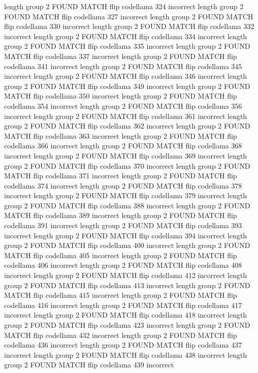 length group  2
FOUND MATCH flip codellama 324 incorrect
length group  2
FOUND MATCH flip codellama 327 incorrect
length group  2
FOUND MATCH flip codellama 330 incorrect
length group  2
FOUND MATCH flip codellama 332 incorrect
length group  2
FOUND MATCH flip codellama 334 incorrect
length group  2
FOUND MATCH flip codellama 335 incorrect
length group  2
FOUND MATCH flip codellama 337 incorrect
length group  2
FOUND MATCH flip codellama 341 incorrect
length group  2
FOUND MATCH flip codellama 345 incorrect
length group  2
FOUND MATCH flip codellama 346 incorrect
length group  2
FOUND MATCH flip codellama 349 incorrect
length group  2
FOUND MATCH flip codellama 350 incorrect
length group  2
FOUND MATCH flip codellama 354 incorrect
length group  2
FOUND MATCH flip codellama 356 incorrect
length group  2
FOUND MATCH flip codellama 361 incorrect
length group  2
FOUND MATCH flip codellama 362 incorrect
length group  2
FOUND MATCH flip codellama 363 incorrect
length group  2
FOUND MATCH flip codellama 366 incorrect
length group  2
FOUND MATCH flip codellama 368 incorrect
length group  2
FOUND MATCH flip codellama 369 incorrect
length group  2
FOUND MATCH flip codellama 370 incorrect
length group  2
FOUND MATCH flip codellama 371 incorrect
length group  2
FOUND MATCH flip codellama 374 incorrect
length group  2
FOUND MATCH flip codellama 378 incorrect
length group  2
FOUND MATCH flip codellama 379 incorrect
length group  2
FOUND MATCH flip codellama 388 incorrect
length group  2
FOUND MATCH flip codellama 389 incorrect
length group  2
FOUND MATCH flip codellama 391 incorrect
length group  2
FOUND MATCH flip codellama 393 incorrect
length group  2
FOUND MATCH flip codellama 394 incorrect
length group  2
FOUND MATCH flip codellama 400 incorrect
length group  2
FOUND MATCH flip codellama 405 incorrect
length group  2
FOUND MATCH flip codellama 406 incorrect
length group  2
FOUND MATCH flip codellama 408 incorrect
length group  2
FOUND MATCH flip codellama 412 incorrect
length group  2
FOUND MATCH flip codellama 413 incorrect
length group  2
FOUND MATCH flip codellama 415 incorrect
length group  2
FOUND MATCH flip codellama 416 incorrect
length group  2
FOUND MATCH flip codellama 417 incorrect
length group  2
FOUND MATCH flip codellama 418 incorrect
length group  2
FOUND MATCH flip codellama 423 incorrect
length group  2
FOUND MATCH flip codellama 432 incorrect
length group  2
FOUND MATCH flip codellama 436 incorrect
length group  2
FOUND MATCH flip codellama 437 incorrect
length group  2
FOUND MATCH flip codellama 438 incorrect
length group  2
FOUND MATCH flip codellama 439 incorrect
